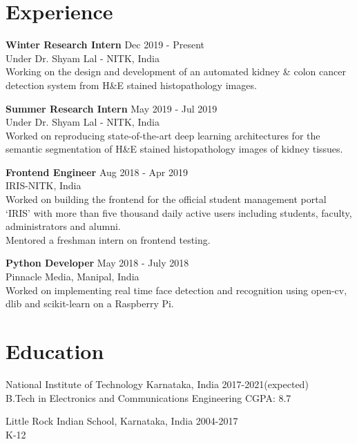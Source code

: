 \documentclass[letterpaper]{article}
\renewenvironment{itemize}{
  \begin{list}{}{
    \setlength{\leftmargin}{1.5em}
  }
}{
  \end{list}
}
\newcommand{\datefont}[1]{\textcolor{black!80}{\small{#1}}}
\begin{document}
\section*{Experience}
  \begin{itemize}
    \item \textbf{Winter Research Intern}
    \hfill{\textcolor{black!80}{\small{Dec 2019 - Present}}}\\
    \datefont{Under Dr. Shyam Lal - NITK, India}\\
      Working on the design and development of an automated kidney \& colon cancer detection system from H\&E stained histopathology images.

    \item \textbf{Summer Research Intern}
    \hfill{\textcolor{black!80}{\small{May 2019 - Jul 2019}}}\\
    \datefont{Under Dr. Shyam Lal - NITK, India}\\
      Worked on reproducing state-of-the-art deep learning architectures for the semantic segmentation of H\&E stained histopathology images of kidney tissues.

    \item \textbf{Frontend Engineer}
    \hfill{\textcolor{black!80}{\small{Aug 2018 - Apr 2019}}}\\
    \datefont{IRIS-NITK, India}\\
      Worked on building the frontend for the official student management portal `IRIS' with more than five thousand daily active users including students, faculty, administrators and alumni.\\
      Mentored a freshman intern on frontend testing.

    \item \textbf{Python Developer}
    \hfill{\textcolor{black!80}{\small{May 2018 - July 2018}}}\\
    \datefont{Pinnacle Media, Manipal, India}\\
      Worked on implementing real time face detection and recognition using open-cv, dlib and scikit-learn on a Raspberry Pi.
  \end{itemize}


\section*{Education}
  \begin{itemize}
    \item National Institute of Technology Karnataka, India\hfill
    \datefont{2017-2021(expected)}
    \\
    \datefont{B.Tech in Electronics and Communications Engineering}
    \hfill{\datefont{CGPA: 8.7}}

    \item Little Rock Indian School, Karnataka, India\hfill
    \datefont{2004-2017}
    \\
    \datefont{K-12}
  \end{itemize}
\end{document}
